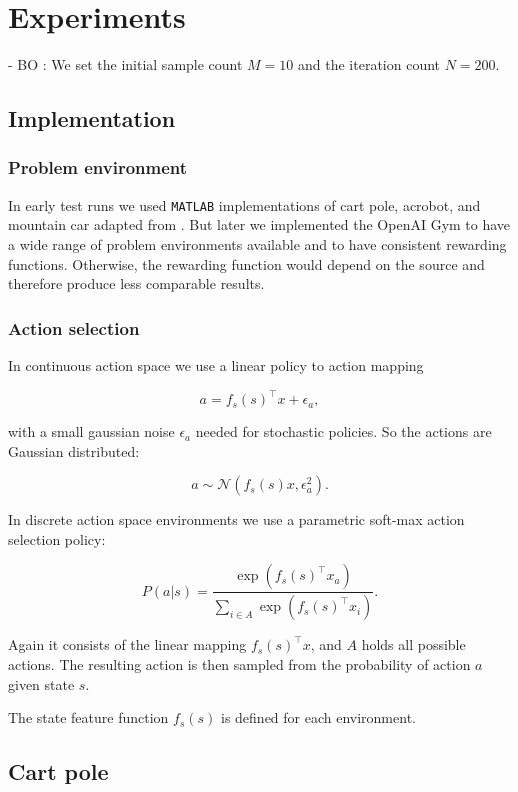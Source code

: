 \chapter{Experiments}
\label{chap:4}

- BO : We set the initial sample count $M = 10$ and the iteration count $N = 200$.

\section{Implementation}

\subsection{Problem environment}
In early test runs we used \texttt{MATLAB} implementations of cart pole, acrobot, and mountain car adapted from \cite{joseCode}. But later we implemented the OpenAI Gym to have a wide range of problem environments available and to have consistent rewarding functions. Otherwise, the rewarding function would depend on the source and therefore produce less comparable results.






\subsection{Action selection}

In continuous action space we use a linear policy to action mapping

$$a = f_s(s)^\top x + \epsilon_a,$$

with a small gaussian noise $\epsilon_a$ needed for stochastic policies. So the actions are Gaussian distributed:

$$a \sim \mathcal{N}(f_s(s) x,\epsilon_a^2).$$

In discrete action space environments we use a parametric soft-max action selection policy:

$$P(a|s)= \frac{\exp(f_s(s)^\top x_a)}{\sum_{i\in A} \exp(f_s(s)^\top x_i)}.$$

Again it consists of the linear mapping $f_s(s)^\top x$, and $A$ holds all possible actions. The resulting action is then sampled from the probability of action $a$ given state $s$.

The state feature function $f_s(s)$ is defined for each environment.

\section{Cart pole}

